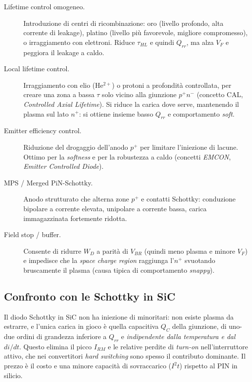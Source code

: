 \begin{description}
\item[Lifetime control omogeneo.] Introduzione di centri di ricombinazione:
oro (livello profondo, alta corrente di leakage), platino (livello più
favorevole, migliore compromesso), o irraggiamento con elettroni. Riduce
$\tau_{HL}$ e quindi $Q_{rr}$, ma alza $V_F$ e peggiora il leakage a caldo.

\item[Local lifetime control.] Irraggiamento con elio (He$^{2+}$) o protoni a
profondità controllata, per creare una zona a bassa $\tau$ solo vicino alla
giunzione $p^{+}n^{-}$ (concetto CAL, \emph{Controlled Axial Lifetime}). Si
riduce la carica dove serve, mantenendo il plasma sul lato $n^{+}$: si ottiene
insieme basso $Q_{rr}$ e comportamento \emph{soft}.

\item[Emitter efficiency control.] Riduzione del drogaggio dell'anodo $p^{+}$
per limitare l'iniezione di lacune. Ottimo per la \emph{softness} e per la
robustezza a caldo (concetti \emph{EMCON}, \emph{Emitter Controlled Diode}).

\item[MPS / Merged PiN-Schottky.] Anodo strutturato che alterna zone $p^{+}$ e
contatti Schottky: conduzione bipolare a corrente elevata, unipolare a corrente
bassa, carica immagazzinata fortemente ridotta.

\item[Field stop / buffer.] Consente di ridurre $W_D$ a parità di $V_{BR}$
(quindi meno plasma e minore $V_F$) e impedisce che la \emph{space charge
region} raggiunga l'$n^{+}$ svuotando bruscamente il plasma
(causa tipica di comportamento \emph{snappy}).
\end{description}

\subsection{Confronto con le Schottky in SiC}

Il diodo Schottky in SiC non ha iniezione di minoritari: non esiste plasma da
estrarre, e l'unica carica in gioco è quella capacitiva $Q_C$ della giunzione,
di uno-due ordini di grandezza inferiore a $Q_{rr}$ e \emph{indipendente dalla
temperatura e dal $di/dt$}. Questo elimina il picco $I_{RM}$ e le relative
perdite di \emph{turn-on} nell'interruttore attivo, che nei convertitori
\emph{hard switching} sono spesso il contributo dominante. Il prezzo è il costo
e una minore capacità di sovraccarico ($I^{2}t$) rispetto al PIN in silicio.

